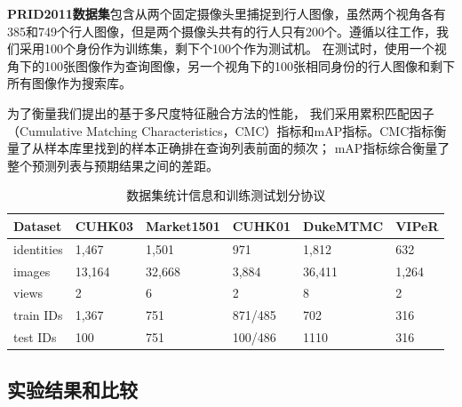 \textbf{PRID2011数据集}包含从两个固定摄像头里捕捉到行人图像，虽然两个视角各有385和749个行人图像，但是两个摄像头共有的行人只有200个。遵循以往工作，我们采用100个身份作为训练集，剩下个100个作为测试机。
	在测试时，使用一个视角下的100张图像作为查询图像，另一个视角下的100张相同身份的行人图像和剩下所有图像作为搜索库。

为了衡量我们提出的基于多尺度特征融合方法的性能，
我们采用累积匹配因子（Cumulative Matching Characteristics，CMC）指标和mAP指标。CMC指标衡量了从样本库里找到的样本正确排在查询列表前面的频次；
mAP指标综合衡量了整个预测列表与预期结果之间的差距。

\begin{table}
	\centering
	\caption{数据集统计信息和训练测试划分协议}
	\label{table:dataset}
	\begin{tabular}{llllll}
		\toprule
		Dataset    & CUHK03 & Market1501 & CUHK01  & DukeMTMC & VIPeR \\
		\midrule
		identities & 1,467  & 1,501      & 971     & 1,812    & 632   \\
		images     & 13,164 & 32,668     & 3,884   & 36,411   & 1,264 \\
		views      & 2      & 6          & 2       & 8        & 2     \\
		train IDs  & 1,367  & 751        & 871/485 & 702      & 316   \\
		test IDs   & 100    & 751        & 100/486 & 1110     & 316   \\
		\bottomrule
	\end{tabular}
\end{table}

\subsection{实验结果和比较}

